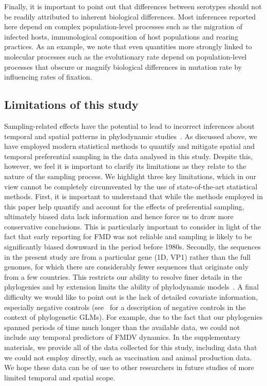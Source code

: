 \documentclass[10pt]{article}
\begin{document}
Finally, it is important to point out that differences between serotypes should not be readily attributed to inherent biological differences.
Most inferences reported here depend on complex population-level processes such as the migration of infected hosts, immunological composition of host populations and rearing practices.
As an example, we note that even quantities more strongly linked to molecular processes such as the evolutionary rate depend on population-level processes that obscure or magnify biological differences in mutation rate by influencing rates of fixation.

\subsection*{Limitations of this study}

Sampling-related effects have the potential to lead to incorrect inferences about temporal and spatial patterns in phylodynamic studies~\citep{Hall2016,Dearlove2017}.
As discussed above, we have employed modern statistical methods to quantify and mitigate spatial and temporal preferential sampling in the data analysed in this study.
Despite this, however, we feel it is important to clarify its limitations as they relate to the nature of the sampling process.
We highlight three key limitations, which in our view cannot be completely circumvented by the use of state-of-the-art statistical methods. 
First, it is important to understand that while the methods employed in this paper help quantify and account for the effects of preferential sampling, ultimately biased data lack information and hence force us to draw more conservative conclusions.
This is particularly important to consider in light of the fact that early reporting for FMD was not reliable and sampling is likely to be significantly biased downward in the period before 1980s.
Secondly, the sequences in the present study are from a particular gene (1D, VP1) rather than the full genomes, for which there are considerably fewer sequences that originate only from a few countries.
This restricts our ability to resolve finer details in the phylogenies and by extension limits the ability of phylodynamic models~\citep{Valdazo2012,Dudas2019}.
A final difficulty we would like to point out is the lack of detailed covariate information, especially negative controls (see~\cite{Dellicour2018} for a description of negative controls in the context of phylogenetic GLMs).
For example, due to the fact that our phylogenies spanned periods of time much longer than the available data, we could not include any temporal predictors of FMDV dynamics. %
In the supplementary materials, we provide all of the data collected for this study, including data that we could not employ directly, such as vaccination and animal production data.
We hope these data can be of use to other researchers in future studies of more limited temporal and spatial scope.
\end{document}
